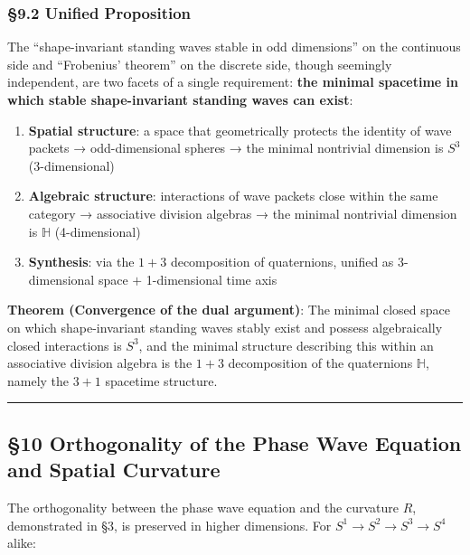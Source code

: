 \documentclass[
  a4paper,11pt]{article}
\providecommand{\tightlist}{%
  \setlength{\itemsep}{0pt}\setlength{\parskip}{0pt}}
\theoremstyle{definition}
\theoremstyle{remark}
\begin{document}
\subsubsection{§9.2 Unified Proposition}\label{unified-proposition}

The ``shape-invariant standing waves stable in odd dimensions'' on the
continuous side and ``Frobenius' theorem'' on the discrete side, though
seemingly independent, are two facets of a single requirement:
\textbf{the minimal spacetime in which stable shape-invariant standing
waves can exist}:

\begin{enumerate}
\def\labelenumi{\arabic{enumi}.}
\tightlist
\item
  \textbf{Spatial structure}: a space that geometrically protects the
  identity of wave packets → odd-dimensional spheres → the minimal
  nontrivial dimension is \(S^3\) (3-dimensional)
\item
  \textbf{Algebraic structure}: interactions of wave packets close
  within the same category → associative division algebras → the minimal
  nontrivial dimension is \(\mathbb{H}\) (4-dimensional)
\item
  \textbf{Synthesis}: via the \(1+3\) decomposition of quaternions,
  unified as 3-dimensional space \(+\) 1-dimensional time axis
\end{enumerate}

\textbf{Theorem (Convergence of the dual argument)}: The minimal closed
space on which shape-invariant standing waves stably exist and possess
algebraically closed interactions is \(S^3\), and the minimal structure
describing this within an associative division algebra is the \(1+3\)
decomposition of the quaternions \(\mathbb{H}\), namely the \(3+1\)
spacetime structure.

\begin{center}\rule{0.5\linewidth}{0.5pt}\end{center}

\subsection{§10 Orthogonality of the Phase Wave Equation and Spatial
Curvature}\label{orthogonality-of-the-phase-wave-equation-and-spatial-curvature}

The orthogonality between the phase wave equation and the curvature
\(R\), demonstrated in §3, is preserved in higher dimensions. For
\(S^1 \to S^2 \to S^3 \to S^4\) alike:
\end{document}
